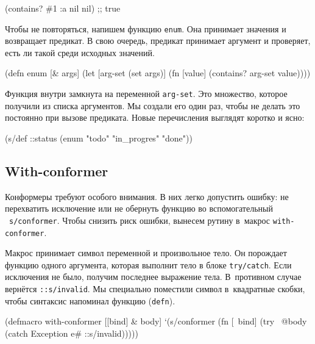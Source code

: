 \begin{english}
  \begin{clojure}
(contains? #{1 :a nil} nil) ;; true
  \end{clojure}
\end{english}

Чтобы не повторяться, напишем функцию \verb|enum|. Она принимает значения и
возвращает предикат. В свою очередь, предикат принимает аргумент и проверяет,
есть ли такой среди исходных значений.

\begin{english}
  \begin{clojure}
(defn enum [& args]
  (let [arg-set (set args)]
    (fn [value]
      (contains? arg-set value))))
  \end{clojure}
\end{english}

Функция внутри замкнута на переменной \verb|arg-set|. Это множество, которое
получили из списка аргументов. Мы создали его один раз, чтобы не делать это
постоянно при вызове предиката. Новые перечисления выглядят коротко и ясно:

\begin{english}
  \begin{clojure}
(s/def ::status
  (enum "todo"
        "in_progres"
        "done"))
  \end{clojure}
\end{english}

\subsection{With-conformer}


Конформеры требуют особого внимания. В них легко допустить ошибку: не
перехватить исключение или не обернуть функцию во вспомогательный
~\verb|s/conformer|. Чтобы снизить риск ошибки, вынесем рутину в~макрос
\verb|with-conformer|.

Макрос принимает символ переменной и произвольное тело. Он порождает функцию
одного аргумента, которая выполнит тело в блоке \verb|try/catch|. Если
исключения не было, получим последнее выражение тела. В~противном случае
вернётся \verb|::s/invalid|. Мы специально поместили символ в~квадратные скобки,
чтобы синтаксис напоминал функцию (\verb|defn|).

\begin{english}
  \begin{clojure}
(defmacro with-conformer
  [[bind] & body]
  `(s/conformer
    (fn [~bind]
      (try
        ~@body
        (catch Exception e#
          ::s/invalid)))))
  \end{clojure}
\end{english}

